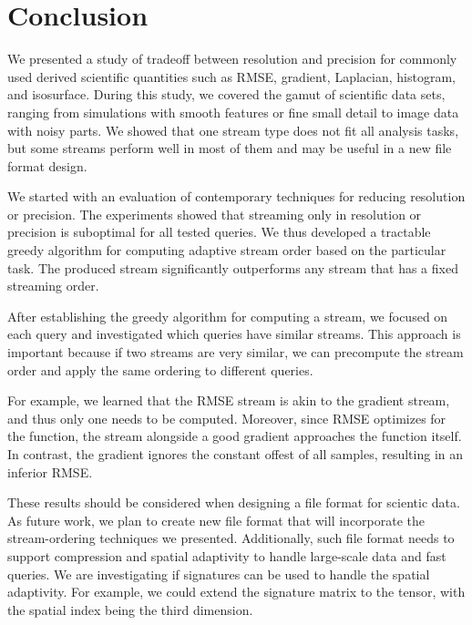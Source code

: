 \section{Conclusion}
We presented a study of tradeoff between resolution and precision for commonly used derived
scientific quantities such as RMSE, gradient, Laplacian, histogram, and isosurface.
During this study, we covered the gamut of scientific data sets, ranging from simulations
with smooth features or fine small detail to image data with noisy parts.
We showed that one stream type does not fit all analysis tasks, but some streams perform well
in most of them and may be useful in a new file format design.





We started with an evaluation of contemporary techniques for reducing resolution or precision.
The experiments showed that streaming only in resolution or precision is suboptimal for all
tested queries. We thus developed a tractable greedy algorithm for computing adaptive stream order
based on the particular task. The produced stream significantly outperforms any stream that has
a fixed streaming order.

After establishing the greedy algorithm for computing a stream, we focused on each query and
investigated which queries have similar streams. This approach is important because if two streams
are very similar, we can precompute the stream order and apply the same ordering to different
queries.

For example, we learned that the RMSE stream is akin to the gradient stream, and thus only one
needs to be computed. Moreover, since RMSE optimizes for the function, the stream alongside
a good gradient approaches the function itself. In contrast, the gradient ignores the constant offest
of all samples, resulting in an inferior RMSE.


These results should be considered when designing a file format for scientic data. As future work,
we plan to create new file format that will incorporate the stream-ordering techniques we presented.
Additionally, such file format needs to support compression and spatial adaptivity to handle large-scale
data and fast queries. We are investigating if signatures can be used to handle
the spatial adaptivity. For example, we could extend the signature matrix to the tensor, with
the spatial index being the third dimension.

